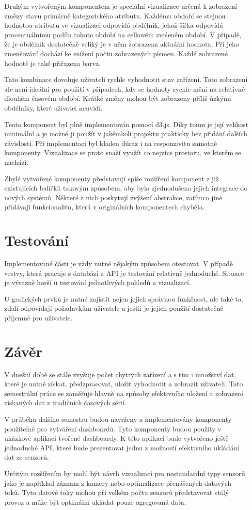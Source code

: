 Druhým vytvořeným komponentem je speciální vizualizace určená k zobrazení změny stavu primárně kategorického atributu. Každému období se stejnou hodnotou atributu ve vizualizaci odpovídá obdélník, jehož šířka odpovídá procentuálnímu podílu tohoto období na celkovém zvoleném období. V případě, že je obdélník dostatečně veliký je v něm zobrazena aktuální hodnota. Při jeho zmenšování dochází ke snížení počtu zobrazených písmen. Každé zobrazené hodnotě je také přiřazena barva.

Tato kombinace dovoluje uživateli rychle vyhodnotit stav zařízení. Toto zobrazení ale není ideální pro použití v případech, kdy se hodnoty rychle mění na relativně dlouhém časovém období. Krátké změny mohou být zobrazeny příliš úzkými obdélníky, které uživatel neuvidí. 

Tento komponent byl plně implementován pomocí d3.js. Díky tomu je její velikost minimální a je možné ji použít v jakémkoli projektu prakticky bez přidání dalších závislostí. Při implementaci byl kladen důraz i na responzivitu samotné komponenty. Vizualizace se proto snaží využít co nejvíce prostoru, ve kterém se nachází.

Zbylé vytvořené komponenty představují spíše rozšíření komponent z již existujících balíčků takovým způsobem, aby byla zjednodušena jejich integrace do nových systémů. Některé z nich poskytují zvýšení abstrakce, zatímco jiné přidávají funkcionalitu, která v originálních komponentech chyběla.

\chapter{Testování}
Implementované části je vždy nutné nějakým způsobem otestovat. V případě vrstvy, která pracuje s databází a API je testování relativně jednoduché. Situace je výrazně horší u testování jednotlivých pohledů a vizualizací. 

U grafických prvků je nutné zajistit nejen jejich správnou funkčnost, ale také to, zdali odpovídají požadavkům uživatele a jestli je jejich použití dostatečně příjemné pro uživatele. 

\label{chapter_testing}
\chapter{Závěr}
V dnešní době se stále zvyšuje počet chytrých zařízení a s tím i množství dat, které je nutné získat, předzpracovat, uložit vyhodnotit a zobrazit uživateli. Tato semestrální práce se zaměřuje hlavně na způsoby efektivního uložení a zobrazení získaných dat z tradičních časových sérií.

V průběhu dalšího semestru budou navrženy a implementovány komponenty použitelné pro vytváření dashboardů. Tyto komponenty budou použity v ukázkové aplikaci tvořené dashboardy. K této aplikaci bude vytvořeno ještě jednoduché API, které bude prezentovat jednu z možností efektivního ukládání dat ze senzorů.

Určitým rozšířením by mohl být návrh vizualizací pro nestandardní typy senzorů jako je například záznam z kamery nebo optimalizace přenášených datových toků. Tyto datové toky mohou při velkém počtu senzorů představovat stálý provoz a může být optimální ukládat pouze agregovaná data.

